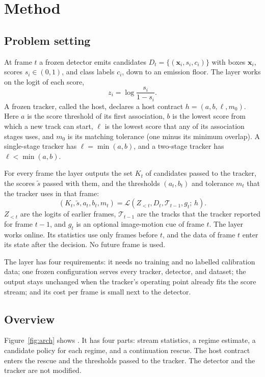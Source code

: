 \section{Method}\label{sec:method}

\subsection{Problem setting}\label{sec:problem}
At frame $t$ a frozen detector emits candidates $D_t=\{(\mathbf{x}_i,s_i,c_i)\}$
with boxes $\mathbf{x}_i$, scores $s_i\in(0,1)$, and class labels $c_i$, down
to an emission floor. The layer works on the logit of each score,
\begin{equation}
z_i=\log\frac{s_i}{1-s_i}.
\label{eq:logit}
\end{equation}
A frozen tracker, called the host, declares a host contract
$h=(a,b,\ell,m_0)$. Here $a$ is the score threshold of its first association,
$b$ is the lowest score from which a new track can start, $\ell$ is the lowest
score that any of its association stages uses, and $m_0$ is its matching
tolerance (one minus its minimum overlap). A single-stage tracker has
$\ell=\min(a,b)$, and a two-stage tracker has $\ell<\min(a,b)$.

For every frame the layer outputs the set $K_t$ of candidates passed to the
tracker, the scores $\tilde{s}$ passed with them, and the thresholds
$(a_t,b_t)$ and tolerance $m_t$ that the tracker uses in that frame:
\begin{equation}
\left(K_t,\tilde{s},a_t,b_t,m_t\right)=
\mathcal{L}\left(Z_{<t},D_t,\mathcal{T}_{t-1},g_t;\,h\right).
\label{eq:layer}
\end{equation}
$Z_{<t}$ are the logits of earlier frames, $\mathcal{T}_{t-1}$ are the
tracks that the tracker reported for frame $t-1$, and $g_t$ is an optional
image-motion cue of frame $t$. The layer works online. Its statistics use only
frames before $t$, and the data of frame $t$ enter its state after the
decision. No future frame is used.

The layer has four requirements: it needs no training and no labelled
calibration data; one frozen configuration serves every tracker, detector, and
dataset; the output stays unchanged when the tracker's operating point already
fits the score stream; and its cost per frame is small next to the detector.

\subsection{Overview}
Figure~\ref{fig:arch} shows \scl{}. It has four parts: stream statistics, a
regime estimate, a candidate policy for each regime, and a continuation
rescue. The host contract enters the rescue and the thresholds passed to the
tracker. The detector and the tracker are not modified.

